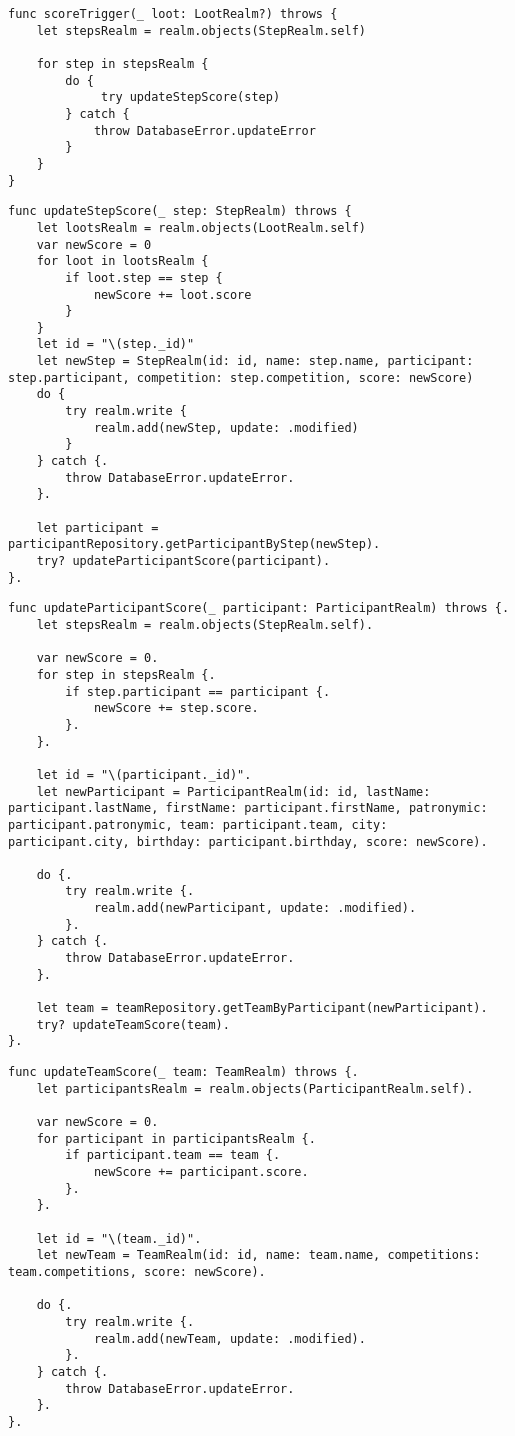 \begin{lstlisting}[label=lst:code3, caption=Код функции триггера --- scoreTrigger]   
func scoreTrigger(_ loot: LootRealm?) throws {
	let stepsRealm = realm.objects(StepRealm.self)

	for step in stepsRealm {
		do {
			 try updateStepScore(step)
		} catch {
			throw DatabaseError.updateError
		}
	}
}
\end{lstlisting}

\begin{lstlisting}[label=lst:code4, caption=Код вспомогательной функции updateStepScore]
func updateStepScore(_ step: StepRealm) throws {
	let lootsRealm = realm.objects(LootRealm.self)
	var newScore = 0
	for loot in lootsRealm {
		if loot.step == step {
			newScore += loot.score
		}
	}
	let id = "\(step._id)"
	let newStep = StepRealm(id: id, name: step.name, participant: step.participant, competition: step.competition, score: newScore)
	do {
		try realm.write {
			realm.add(newStep, update: .modified)
		}
	} catch {.
		throw DatabaseError.updateError.
	}.
	
	let participant = participantRepository.getParticipantByStep(newStep).
	try? updateParticipantScore(participant).
}.
\end{lstlisting}

\begin{lstlisting}[label=lst:code5, caption=Код вспомогательной функции updateParticipantScore]
func updateParticipantScore(_ participant: ParticipantRealm) throws {.
	let stepsRealm = realm.objects(StepRealm.self).
        
	var newScore = 0.
	for step in stepsRealm {.
		if step.participant == participant {.
			newScore += step.score.
		}.
	}.
        
	let id = "\(participant._id)".
	let newParticipant = ParticipantRealm(id: id, lastName: participant.lastName, firstName: participant.firstName, patronymic: participant.patronymic, team: participant.team, city: participant.city, birthday: participant.birthday, score: newScore).
        
	do {.
		try realm.write {.
			realm.add(newParticipant, update: .modified).
		}.
	} catch {.
		throw DatabaseError.updateError.
	}.
	
	let team = teamRepository.getTeamByParticipant(newParticipant).
	try? updateTeamScore(team).
}.
\end{lstlisting}

\begin{lstlisting}[label=lst:code6, caption=Код вспомогательной функции updateTeamScore]
func updateTeamScore(_ team: TeamRealm) throws {.
	let participantsRealm = realm.objects(ParticipantRealm.self).
        
	var newScore = 0.
	for participant in participantsRealm {.
		if participant.team == team {.
			newScore += participant.score.
		}.
	}.
        
	let id = "\(team._id)".
	let newTeam = TeamRealm(id: id, name: team.name, competitions: team.competitions, score: newScore).
        
	do {.
		try realm.write {.
			realm.add(newTeam, update: .modified).
		}.
	} catch {.
		throw DatabaseError.updateError.
	}.
}.
\end{lstlisting}

